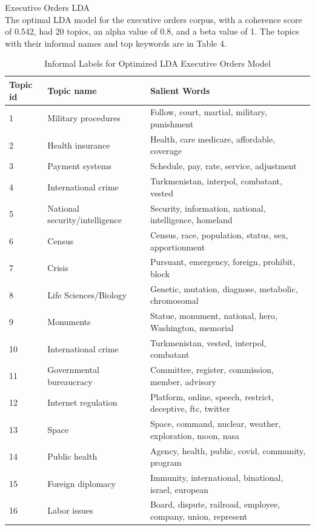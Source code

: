 \documentclass{article}
\begin{document}
{{Executive Orders LDA \\
The optimal LDA model for the executive orders corpus, with a coherence score of 0.542, had 20 topics, an alpha value of 0.8, and a beta value of 1. The topics with their informal names and top keywords are in Table 4. 

\begin{table}[H]
	\caption{Informal Labels for Optimized LDA Executive Orders Model}
	\centering
	\begin{tabular}{lll}
		\toprule
		\midrule
		Topic id  & Topic name & Salient Words \\
		\midrule
		\midrule
		1 & Military procedures & Follow, court, martial, military, punishment \\
		\midrule
		2 & Health insurance & Health, care medicare, affordable, coverage \\
		\midrule
		3 & Payment systems & Schedule, pay, rate, service, adjustment \\
		\midrule
		4 & International crime & Turkmenistan, interpol, combatant, vested  \\
		\midrule
		5 & National security/intelligence & Security, information, national, intelligence, homeland \\
		\midrule
		6 & Census & Census, race, population, status, sex, apportionment\\
		\midrule
		7 & Crisis & Pursuant, emergency, foreign, prohibit, block\\
		\midrule
		8 & Life Sciences/Biology & Genetic, mutation, diagnose, metabolic, chromosomal\\
		\midrule
		9 & Monuments & Statue, monument, national, hero, Washington, memorial\\
		\midrule
		10 & International crime & Turkmenistan, vested, interpol, combatant\\
		\midrule
		11 & Governmental bureaucracy & Committee, register, commission, member, advisory\\
		\midrule
		12 & Internet regulation & Platform, online, speech, restrict, deceptive, ftc, twitter\\
		\midrule
		13 & Space & Space, command, nuclear, weather, exploration, moon, nasa\\
		\midrule
		14 & Public health & Agency, health, public, covid, community, program\\
		\midrule
		15 & Foreign diplomacy & Immunity, international, binational, israel, european\\
		\midrule
		16 & Labor issues & Board, dispute, railroad, employee, company, union, represent\\

\end{tabular}
\end{table}}}
\end{document}
